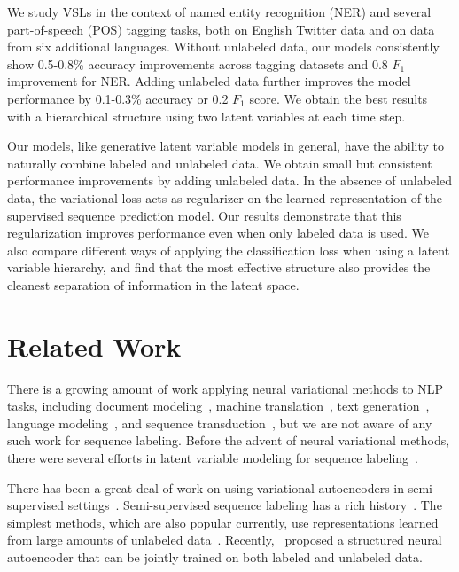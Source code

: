 \documentclass[11pt,a4paper]{article}
\begin{document}
We study VSLs in the context of named entity recognition (NER) and several part-of-speech (POS) tagging tasks, both on English Twitter data and on data from six additional languages.
Without unlabeled data, our models consistently show 0.5-0.8\% accuracy improvements across tagging datasets and 0.8 $F_1$ improvement for NER. Adding unlabeled data further improves the model performance by 0.1-0.3\% accuracy or 0.2 $F_1$ score.
We obtain the best results with a hierarchical structure using two latent variables at each time step.

Our models, like generative latent variable models in general, have the ability to naturally combine labeled and unlabeled data. We obtain small but consistent performance improvements by adding unlabeled data.  In the absence of unlabeled data, the variational loss
acts as regularizer on the learned representation of the supervised sequence prediction model.
Our results demonstrate that this regularization improves performance
even when only labeled data is used.
We also compare different ways of applying the classification loss when using a latent variable hierarchy, and find that the most effective structure also provides the cleanest separation of information in the latent space.

\section{Related Work}

There is a growing amount of work applying neural variational methods to NLP tasks, including document modeling~\cite{mnih2014neural,miao2016neural,serban2017piecewise}, machine translation~\cite{zhang2016variational}, text generation~\cite{bowman2016generating,serban2017piecewise,hu2017toward}, language modeling~\cite{bowman2016generating,yang2017improved}, and sequence transduction~\cite{zhou2017multi}, but we are not aware of any such work for sequence labeling. Before the advent of neural variational methods, there were several efforts in latent variable modeling for sequence labeling~\cite{quattoni2007hidden,SunT09}.

There has been a great deal of work on using variational autoencoders in semi-supervised settings~\cite{kingma2014semi,maaloe2016auxiliary,zhou2017multi,yang2017improved}.
Semi-supervised sequence labeling has a rich history~\cite{altun2006maximum,jiao-EtAl:2006:COLACL,mann-mccallum:2008:ACLMain,subramanya-petrov-pereira:2010:EMNLP,sogaard:2011:ACL-HLT20111}. The simplest methods, which are also popular currently, use representations learned from large amounts of unlabeled data~\cite{miller-guinness-zamanian:2004:HLTNAACL,owoputi-13, peters2017semi}. Recently,~\citet{zhang2017semi} proposed a structured neural autoencoder that can be jointly trained on both labeled and unlabeled data.
\end{document}
